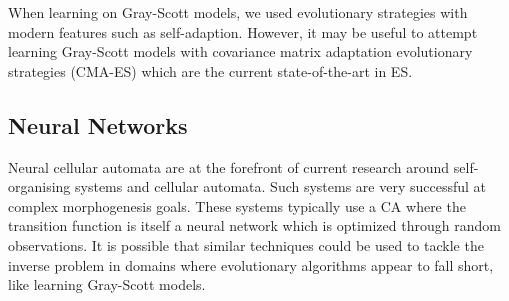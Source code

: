 When learning on Gray-Scott models, we used evolutionary strategies with modern features such as self-adaption. However, it may be useful to attempt learning Gray-Scott models with covariance matrix adaptation evolutionary strategies (CMA-ES) which are the current state-of-the-art in ES.

\subsection{Neural Networks}

Neural cellular automata are at the forefront of current research around self-organising systems and cellular automata. Such systems are very successful at complex morphogenesis goals. These systems typically use a CA where the transition function is itself a neural network which is optimized through random observations. It is possible that similar techniques could be used to tackle the inverse problem in domains where evolutionary algorithms appear to fall short, like learning Gray-Scott models.
